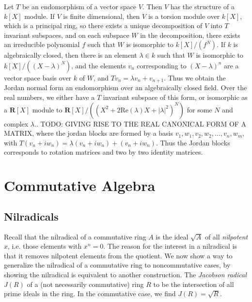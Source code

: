 \begin{example}
    Let $T$ be an endomorphism of a vector space $V$. Then $V$ has the structure of a $k[X]$ module. If $V$ is finite dimensional, then $V$ is a torsion module over $k[X]$, which is a principal ring, so there exists a unique decomposition of $V$ into $T$ invariant subspaces, and on each subspace $W$ in the decomposition, there exists an irreducible polynomial $f$ such that $W$ is isomorphic to $k[X]/(f^N)$. If $k$ is algebraically closed, then there is an element $\lambda \in k$ such that $W$ is isomorphic to $k[X]/((X - \lambda)^N)$, and the elements $v_n$ corresponding to $(X - \lambda)^n$ are a vector space basis over $k$ of $W$, and $Tv_n = \lambda v_n + v_{n+1}$. Thus we obtain the Jordan normal form an endomorphism over an algebraically closed field. Over the real numbers, we either have a $T$ invariant subspace of this form, or isomorphic as a $\mathbf{R}[X]$ module to $\mathbf{R}[X]/((X^2 + 2 \text{Re}(\lambda) X + |\lambda|^2)^N)$ for some $N$ and complex $\lambda$.. TODO: GIVING RISE TO THE REAL CANONICAL FORM OF A MATRIX, where the jordan blocks are formed by a basis $v_1,w_1, v_2, w_2, \dots, v_n,w_m$, with $T(v_n + iw_n) = \lambda(v_n + iw_n) + (v_n + iw_n)$. Thus the Jordan blocks corresponds to rotation matrices and two by two identity matrices.
\end{example}




\chapter{Commutative Algebra}

\section{Nilradicals}

Recall that the nilradical of a commutative ring $A$ is the ideal $\sqrt{A}$ of all {\it nilpotent} $x$, i.e. those elements with $x^n = 0$. The reason for the interest in a nilradical is that it removes nilpotent elements from the quotient. We now show a way to generalize the nilradical of a commutative ring to noncommutative cases, by showing the nilradical is equivalent to another construction. The \emph{Jacobson radical} $J(R)$ of a (not necessarily commutative) ring $R$ to be the intersection of all prime ideals in the ring. In the commutative case, we find $J(R) = \sqrt{R}$.

